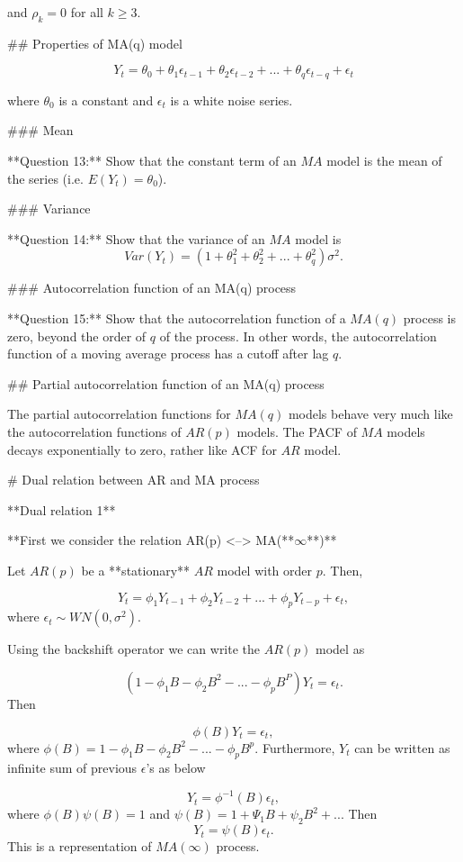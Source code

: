 \documentclass[11pt,a4paper,]{article}
\begin{document}
{and $\rho_k=0$ for all $k \geq 3.$

## Properties of MA(q) model

\begin{equation}
  \label{eq:ma2}
Y_t = \theta_0 + \theta_1 \epsilon_{t-1} + \theta_2 \epsilon_{t-2} +...+ \theta_q \epsilon_{t-q} +\epsilon_t
\end{equation}

where $\theta_0$ is a constant and ${\epsilon_t}$ is a white noise series.

### Mean

**Question 13:** Show that the constant term of an $MA$ model is the mean of the series (i.e. $E(Y_t)=\theta_0$).

### Variance

**Question 14:** Show that the variance of an $MA$ model is 
$$Var(Y_t)=(1+\theta_1^2+\theta_2^2+...+\theta_q^2)\sigma^2.$$

### Autocorrelation function of an MA(q) process

**Question 15:** Show that the autocorrelation function of a $MA(q)$ process is zero, beyond the order of $q$ of the process. In other words, the autocorrelation function of a moving average process has a cutoff after lag $q$.

## Partial autocorrelation function of an MA(q) process

The partial autocorrelation functions for $MA(q)$ models behave very much like the autocorrelation functions of $AR(p)$ models. The PACF of $MA$ models decays exponentially to zero, rather like ACF for $AR$ model.

# Dual relation between AR and MA process

**Dual relation 1**

**First we consider the relation AR(p) <--> MA(**$\infty$**)**

Let $AR(p)$ be a **stationary** $AR$ model with order $p$. Then,

$$Y_t = \phi_1Y_{t-1}+ \phi_2Y_{t-2}+...+ \phi_pY_{t-p}+\epsilon_t,$$
where $\epsilon_t \sim WN(0, \sigma^2).$

Using the backshift operator we can write the $AR(p)$ model as

$$(1-\phi_1B-\phi_2B^2-...-\phi_pB^P)Y_t=\epsilon_t.$$
Then 

$$\phi(B)Y_t=\epsilon_t,$$
where $\phi(B)=1-\phi_1B-\phi_2B^2-...-\phi_pB^p.$ Furthermore, $Y_t$ can be written as infinite sum of previous $\epsilon$'s as below

$$Y_t = \phi^{-1}(B)\epsilon_t,$$
where $\phi(B)\psi(B)=1$ and $\psi(B)=1+\Psi_1B+\psi_2B^2+...$ Then $$Y_t=\psi(B)\epsilon_t.$$ 
This is a representation of $MA(\infty)$ process.

}
\end{document}
